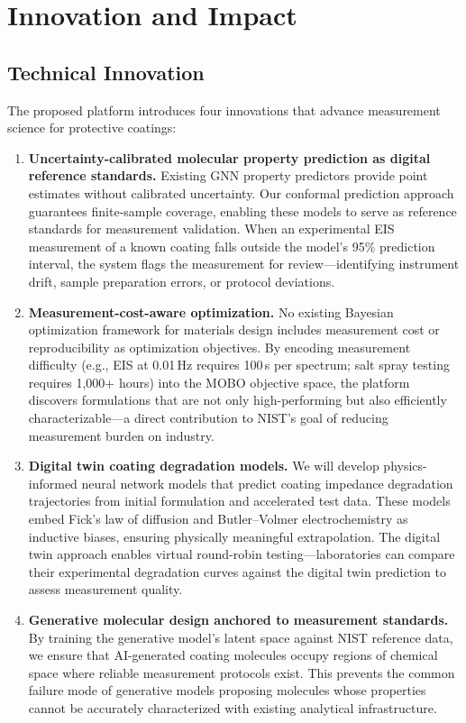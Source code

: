 \documentclass[11pt,letterpaper]{article}
\begin{document}
\section{Innovation and Impact}
\label{sec:innovation}

\subsection{Technical Innovation}

The proposed platform introduces four innovations that advance measurement science for protective coatings:

\begin{enumerate}[leftmargin=*]
  \item \textbf{Uncertainty-calibrated molecular property prediction as digital reference standards.} Existing GNN property predictors provide point estimates without calibrated uncertainty. Our conformal prediction approach guarantees finite-sample coverage, enabling these models to serve as reference standards for measurement validation. When an experimental EIS measurement of a known coating falls outside the model's 95\% prediction interval, the system flags the measurement for review---identifying instrument drift, sample preparation errors, or protocol deviations.

  \item \textbf{Measurement-cost-aware optimization.} No existing Bayesian optimization framework for materials design includes measurement cost or reproducibility as optimization objectives. By encoding measurement difficulty (e.g., EIS at 0.01\,Hz requires 100\,s per spectrum; salt spray testing requires 1,000+ hours) into the MOBO objective space, the platform discovers formulations that are not only high-performing but also efficiently characterizable---a direct contribution to NIST's goal of reducing measurement burden on industry.

  \item \textbf{Digital twin coating degradation models.} We will develop physics-informed neural network models that predict coating impedance degradation trajectories from initial formulation and accelerated test data. These models embed Fick's law of diffusion and Butler--Volmer electrochemistry as inductive biases, ensuring physically meaningful extrapolation. The digital twin approach enables virtual round-robin testing---laboratories can compare their experimental degradation curves against the digital twin prediction to assess measurement quality.

  \item \textbf{Generative molecular design anchored to measurement standards.} By training the generative model's latent space against NIST reference data, we ensure that AI-generated coating molecules occupy regions of chemical space where reliable measurement protocols exist. This prevents the common failure mode of generative models proposing molecules whose properties cannot be accurately characterized with existing analytical infrastructure.
\end{enumerate}
\end{document}
